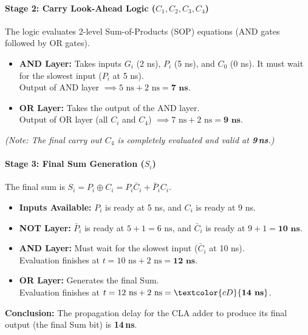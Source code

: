 \documentclass[12pt,a3paper]{article}
\begin{document}
\begin{enumerate}
\begin{tcolorbox}[enhanced,breakable,ansbox,colback=cD!4,colframe=cD,boxrule=0.8pt,arc=5pt,title={\textbf{Answer}},fonttitle=\bfseries\color{white},colbacktitle=cD]
\paragraph{Stage 2: Carry Look-Ahead Logic ($C_1, C_2, C_3, C_4$)}
The logic evaluates 2-level Sum-of-Products (SOP) equations (AND gates followed by OR gates).
\begin{itemize}
    \item \textbf{AND Layer:} Takes inputs $G_i$ (2 ns), $P_i$ (5 ns), and $C_0$ (0 ns). It must wait for the slowest input ($P_i$ at 5 ns). \\
          Output of AND layer $\implies 5\text{ ns} + 2\text{ ns} = \mathbf{7\text{ ns}}$.
    \item \textbf{OR Layer:} Takes the output of the AND layer. \\
          Output of OR layer (all $C_i$ and $C_4$) $\implies 7\text{ ns} + 2\text{ ns} = \mathbf{9\text{ ns}}$.
\end{itemize}
\textit{(Note: The final carry out $C_4$ is completely evaluated and valid at \textbf{9\,ns}.)}

\paragraph{Stage 3: Final Sum Generation ($S_i$)}
The final sum is $S_i = P_i \oplus C_i = P_i \bar{C}_i + \bar{P}_i C_i$.
\begin{itemize}
    \item \textbf{Inputs Available:} $P_i$ is ready at 5 ns, and $C_i$ is ready at 9 ns.
    \item \textbf{NOT Layer:} $\bar{P}_i$ is ready at $5 + 1 = 6\text{ ns}$, and $\bar{C}_i$ is ready at $9 + 1 = \mathbf{10\text{ ns}}$.
    \item \textbf{AND Layer:} Must wait for the slowest input ($\bar{C}_i$ at 10 ns). \\
          Evaluation finishes at $t = 10\text{ ns} + 2\text{ ns} = \mathbf{12\text{ ns}}$.
    \item \textbf{OR Layer:} Generates the final Sum. \\
          Evaluation finishes at $t = 12\text{ ns} + 2\text{ ns} = \textcolor{cD}{\textbf{14\text{ ns}}}$.
\end{itemize}

\vspace{0.2cm}
\textbf{Conclusion:} 
The propagation delay for the CLA adder to produce its final output (the final Sum bit) is \textcolor{cD}{\textbf{14\,ns}}. 


\end{tcolorbox}
\end{enumerate}
\end{document}
